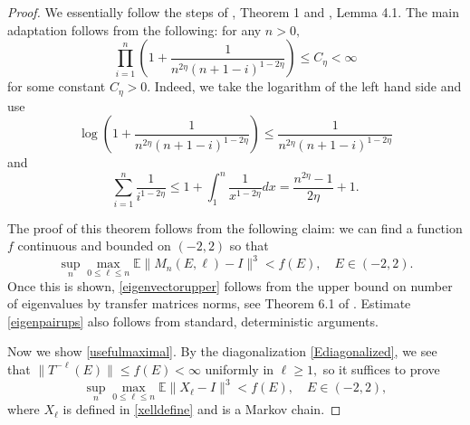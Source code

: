 \documentclass[12pt, reqno]{amsart}
\theoremstyle{definition}
\theoremstyle{remark}
\numberwithin{equation}{section}
\begin{document}
\begin{proof}
    We essentially follow the steps of \cite{kritchevski2011scaling}, Theorem 1 and \cite{rifkind2018eigenvectors}, Lemma 4.1. The main adaptation follows from the following: for any $n>0,$ 
    \begin{equation}
        \label{usefulhaha}
   \prod_{i=1}^n(1+\frac{1}{n^{2\eta}(n+1-i)^{1-2\eta}})\leq C_\eta<\infty\end{equation}
    for some constant $C_\eta>0$. Indeed, we take the logarithm of the left hand side and use
    $$\log(1+\frac{1}{n^{2\eta}(n+1-i)^{1-2\eta}})\leq \frac{1}{n^{2\eta}(n+1-i)^{1-2\eta}}$$
    and
    \begin{equation}
        \label{takingintoaccount}
    \sum_{i=1}^n \frac{1}{i^{1-2\eta}}\leq 1+\int_1^n \frac{1}{x^{1-2\eta}}dx= \frac{n^{2\eta}-1}{2\eta}+1.\end{equation}

    The proof of this theorem follows from the following claim: we can find a function $f$ continuous and bounded on $(-2,2)$ so that
    \begin{equation}
        \label{usefulmaximal}
   \sup_n \max_{0\leq\ell\leq n}\mathbb{E}\|M_n(E,\ell)-I\|^3<f(E),\quad E\in(-2,2).\end{equation} Once this is shown, \eqref{eigenvectorupper} follows from the upper bound on number of eigenvalues by transfer matrices norms, see Theorem 6.1 of \cite{rifkind2018eigenvectors}. Estimate \eqref{eigenpairups} also follows from standard, deterministic  arguments.

Now we show \eqref{usefulmaximal}. By the diagonalization \eqref{Ediagonalized}, we see that  $\|T^{-\ell}(E)\|\leq f(E)<\infty$ uniformly in $\ell\geq 1,$ so it suffices to prove 
 \begin{equation}
   \sup_n \max_{0\leq\ell\leq n}\mathbb{E}\|X_\ell-I\|^3<f(E),\quad E\in(-2,2),\end{equation}
where $X_\ell$ is defined in \eqref{xelldefine} and is a Markov chain.



\end{proof}
\end{document}
